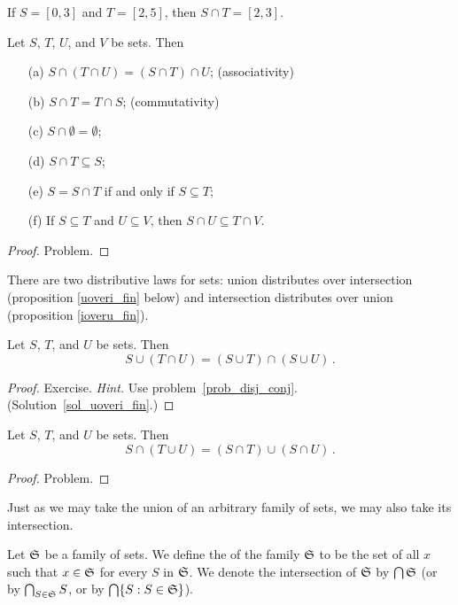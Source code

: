 \begin{exam} If $S = [0,3]$ and $T = [2,5]$, then $S \cap T = [2,3]$.
\end{exam}

\begin{prop}\label{prop_intersection_sets} Let $S$, $T$, $U$, and $V$ be sets.  Then
 \begin{enumerate}
   \item[(a)] $S \cap (T \cap U) = (S \cap T) \cap U$; \qquad (associativity)
   \item[(b)] $S \cap T = T \cap S$; \qquad (commutativity)
   \item[(c)] $S \cap \emptyset = \emptyset$;
   \item[(d)] $S \cap T \subseteq S$;
   \item[(e)] $S = S \cap T$ if and only if $S \subseteq T$;
   \item[(f)] If $S \subseteq T$ and $U \subseteq V$, then $S \cap U \subseteq T \cap V$.
 \end{enumerate}
\end{prop}

\begin{proof} Problem. \ns \end{proof}


There are two distributive laws for sets: union distributes over intersection (proposition
\ref{uoveri_fin} below) and intersection distributes over union (proposition
\ref{ioveru_fin}).

\begin{prop}\label{uoveri_fin} Let $S$, $T$, and $U$ be sets.  Then
  \[ S \cup (T \cap U)  =  (S \cup T) \cap (S \cup U)\,. \]
\end{prop}

\begin{proof} Exercise. \emph{Hint.} Use problem~\ref{prob_disj_conj}.
(Solution~\ref{sol_uoveri_fin}.) \ns
\end{proof}

\begin{prop}\label{ioveru_fin}  Let $S$, $T$, and $U$ be sets. Then
   \[ S \cap (T \cup U)  =  (S \cap T) \cup (S \cap U)\,. \]
\end{prop}

\begin{proof} Problem. \ns \end{proof}

Just as we may take the union of an arbitrary family of sets, we may also take its
intersection.

\begin{defn}  Let $\mathfrak{S}$ be a family of sets.  We define the
 of the family $\mathfrak{S}$ to be the set of all $x$ such that $x \in \mathfrak{S}$ for every $S$ in $\mathfrak{S}$.  We denote the intersection of $\mathfrak{S}$ by $\bigcap\mathfrak{S}$ (or by $\bigcap_{S \in \mathfrak{S}}S$, or by $\bigcap\{S: S \in \mathfrak{S}\}$).
\end{defn}

